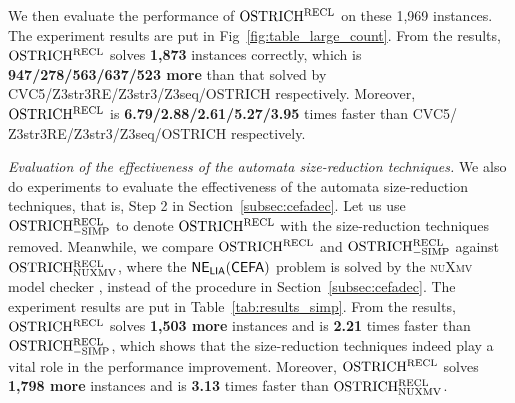 We then evaluate the performance of $\rm OSTRICH^{RECL}$ on these 1,969 instances. 
The experiment results are put in Fig~\ref{fig:table_large_count}. From the results, $\rm OSTRICH^{RECL}$ solves \textbf{1,873} instances correctly, which is \textbf{947/278/563/637/523 more} than that solved by CVC5/Z3str3RE/Z3str3/Z3seq/OSTRICH respectively. Moreover, $\rm OSTRICH^{RECL}$ is \textbf{ 6.79/2.88/2.61/5.27/3.95} times faster than CVC5/ Z3str3RE/Z3str3/Z3seq/OSTRICH respectively.

\medskip
\noindent 
\emph{Evaluation of the effectiveness of the automata size-reduction techniques.}
We also do experiments to evaluate the effectiveness of the automata size-reduction techniques, that is, Step 2 in Section~\ref{subsec:cefadec}. 
Let us use $\rm OSTRICH^{RECL}_{\rm -SIMP}$ to denote $\rm OSTRICH^{RECL}$ with the size-reduction techniques removed. 
Meanwhile, we compare $\rm OSTRICH^{RECL}$ and $\rm OSTRICH^{RECL}_{\rm -SIMP}$ against $\rm OSTRICH^{RECL}_{\rm NUXMV}$, where the ${\sf NE_{LIA}(CEFA)}$ problem is solved by the \textsc{nuXmv} model checker \cite{nuxmv}, instead of the procedure in Section~\ref{subsec:cefadec}. 
The experiment results are put in Table~\ref{tab:results_simp}. 
From the results, $\rm OSTRICH^{RECL}$ solves \textbf{1,503 more} instances and is \textbf{2.21} times faster than $\rm OSTRICH^{RECL}_{\rm -SIMP}$, which shows that the size-reduction techniques indeed play a vital role in the performance improvement. Moreover, $\rm OSTRICH^{RECL}$ solves \textbf{1,798 more} instances and is \textbf{3.13} times faster than $\rm OSTRICH^{RECL}_{\rm NUXMV}$. 







